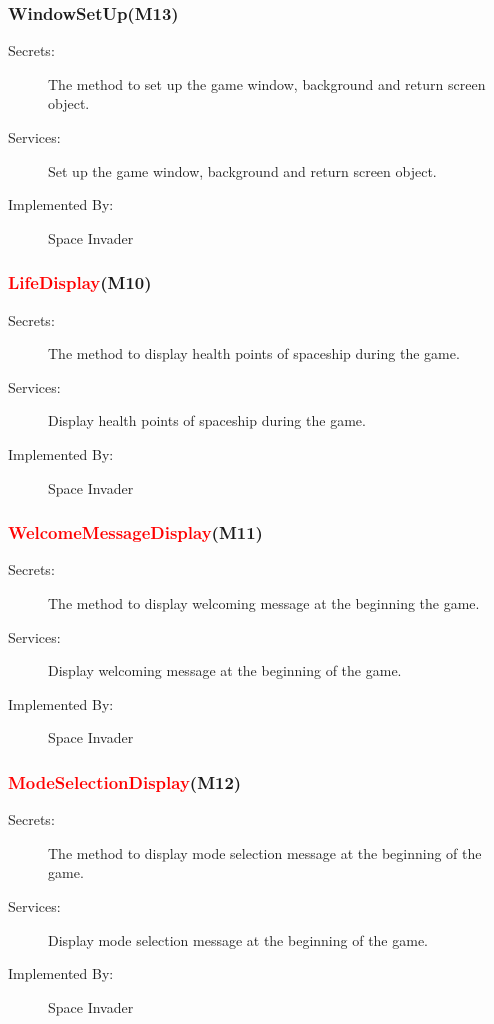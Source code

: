 \documentclass[12pt]{article}
\begin{document}
\subsubsection{WindowSetUp(M13)}
\begin{description}
\item[Secrets:] The method to set up the game window, background and return screen 
object.
\item[Services:]Set up the game window, background and return screen 
object.
\item[Implemented By:] Space Invader
\end{description}

\subsubsection{\textcolor{red}{LifeDisplay}(M10)}
\begin{description}
\item[Secrets:] The method to display health points of spaceship during the game.
\item[Services:]Display health points of spaceship during the game.
\item[Implemented By:] Space Invader
\end{description}

\subsubsection{\textcolor{red}{WelcomeMessageDisplay}(M11)}
\begin{description}
\item[Secrets:] The method to display welcoming message at the beginning the game.
\item[Services:]Display welcoming message at the beginning of the game.
\item[Implemented By:] Space Invader
\end{description}


\subsubsection{\textcolor{red}{ModeSelectionDisplay}(M12)}
\begin{description}
\item[Secrets:] The method to display mode selection message at the beginning of the game.
\item[Services:]Display mode selection message at the beginning of the game.
\item[Implemented By:] Space Invader
\end{description}
\end{document}
